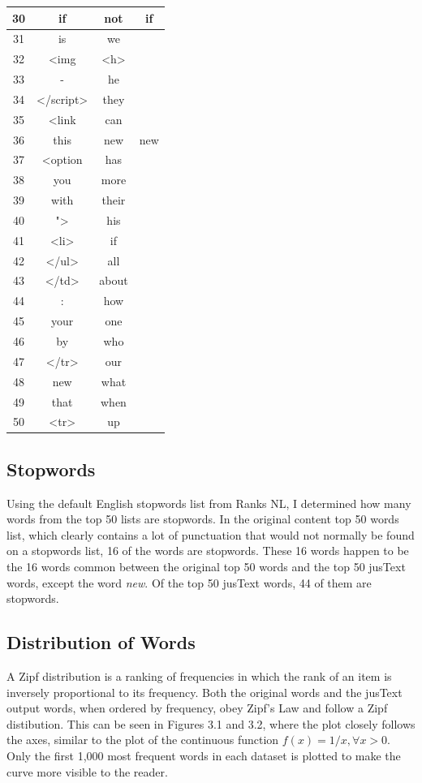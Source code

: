 \documentclass[a4paper,12pt]{article}
\begin{document}
{\begin{table}[H]
\begin{tabular}{ | c | c | c | c | }
30 & if & not & if \\ \hline
31 & is & we & \\ \hline
32 & \textless{}img & \textless{}h\textgreater{} & \\ \hline
33 & - & he & \\ \hline
34 & \textless{}/script\textgreater{} & they & \\ \hline
35 & \textless{}link & can & \\ \hline
36 & this & new & new \\ \hline
37 & \textless{}option & has & \\ \hline
38 & you & more & \\ \hline
39 & with & their & \\ \hline
40 & "\textgreater{} & his & \\ \hline
41 & \textless{}li\textgreater{} & if & \\ \hline
42 & \textless{}/ul\textgreater{} & all & \\ \hline
43 & \textless{}/td\textgreater{} & about & \\ \hline
44 & : & how & \\ \hline
45 & your & one & \\ \hline
46 & by & who & \\ \hline
47 & \textless{}/tr\textgreater{} & our & \\ \hline
48 & new & what & \\ \hline
49 & that & when & \\ \hline
50 & \textless{}tr\textgreater{} & up & \\ \hline
\end{tabular}
\end{table}
}

\subsection{Stopwords}
Using the default English stopwords list from Ranks NL, I determined how many words from the top 50 lists are
stopwords. In the original content top 50 words list, which clearly contains a lot of punctuation that would not
normally be found on a stopwords list, 16 of the words are stopwords. These 16 words happen to be the 16 words
common between the original top 50 words and the top 50 jusText words, except the word \emph{new}. Of the top 50
jusText words, 44 of them are stopwords.

\subsection{Distribution of Words}
A Zipf distribution is a ranking of frequencies in which the rank of an item is inversely proportional to its
frequency\cite{wiki:zipf}. Both the original words and the jusText output words, when ordered by frequency,
obey Zipf's Law and follow a Zipf distibution. This can be seen in Figures 3.1 and 3.2, where the plot closely
follows the axes, similar to the plot of the continuous function \( f(x)=1/x, \forall x > 0 \). Only the first
1,000 most frequent words in each dataset is plotted to make the curve more visible to the reader.
\end{document}

